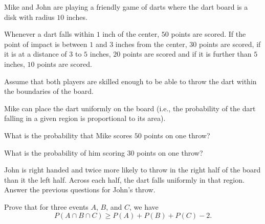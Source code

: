 \begin{problem}
  Mike and John are playing a friendly game of darts where the dart board
  is a disk with radius \(10\) inches.

  Whenever a dart falls within \(1\) inch of the center, \(50\) points are
  scored. If the point of impact is between \(1\) and \(3\) inches from the
  center, \(30\) points are scored, if it is at a distance of \(3\) to
  \(5\) inches, \(20\) points are scored and if it is further than \(5\)
  inches, \(10\) points are scored.

  Assume that both players are skilled enough to be able to throw the dart
  within the boundaries of the board.

  Mike can place the dart uniformly on the board (i.e., the probability of
  the dart falling in a given region is proportional to its area).
  \begin{alphlist}
  \item What is the probability that Mike scores \(50\) points on one
    throw?
  \item What is the probability of him scoring \(30\) points on one throw?
  \item John is right handed and twice more likely to throw in the right
    half of the board than it the left half. Across each half, the dart
    falls uniformly in that region. Answer the previous questions for
    John's throw.
  \end{alphlist}
\end{problem}
\begin{solution*}
\end{solution*}

\begin{problem}
  Prove that for three events \(A\), \(B\), and \(C\), we have
  \[
    P(A\cap B\cap C)\geq P(A)+P(B)+P(C)-2.
  \]
\end{problem}
\begin{solution*}
\end{solution*}

